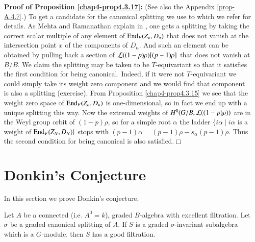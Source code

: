 \noindent
{\bf Proof of Proposition \ref{chap4-prop4.3.17}:} (See also the
Appendix \ref{prop-A.4.7}.) To get a candidate for the canonical splitting we use
\cite{key24} to which we refer for details. As Mehta and Ramanathan
explain in \cite{key24}, one gets a splitting by taking the correct
scalar multiple of any element of $\operatorname{End}_{F}(Z_{n},D_{n})$ that does
not vanish at the intersection point $x$ of the components of
$D_{n}$. And such an element can be obtained by pulling back a section
of $\mathcal{L}((1-p)\rho)[(p-1)\rho]$ that does not vanish at $B/B$. We claim
the splitting may be taken to be $T$-equivariant so that it satisfies
the first condition for being canonical. Indeed, if it were not
$T$-equivariant we could simply take its weight zero component and we
would find that component is also a splitting (exercise). From
Proposition \ref{chap4-prop4.3.15} we see that the weight zero space
of $\operatorname{End}_{F}(Z_{n},D_{n})$ is one-dimensional, so in fact we end up
with a unique splitting this way. Now the extremal weights of
$H^{0}(G/B,\mathcal{L}((1-p)\rho))$ are in the Weyl group orbit of $(1-p)\rho$,
so for a simple root $\alpha$ the ladder $\{i\alpha\mid i\alpha$ is a
weight of $\operatorname{End}_{F}(Z_{N},D_{N})\}$ stops with
$(p-1)\alpha=(p-1)\rho-s_{\alpha}(p-1)\rho$. Thus the second condition
for being canonical is also satisfied.\hfill$\Box$

\section{Donkin's Conjecture}\label{chap4-sec4.4}

In this section we prove Donkin's conjecture.

\begin{theorem}\label{chap4-thm4.4.1} 
Let $A$ be a connected (i.e. $A^{0}=k$), graded $B$-algebra with
excellent filtration. Let $\sigma$ be a graded canonical splitting of
$A$. If $S$ is a graded $\sigma$-invariant subalgebra which is a
$G$-module, then $S$ has a good filtration.
\end{theorem}

